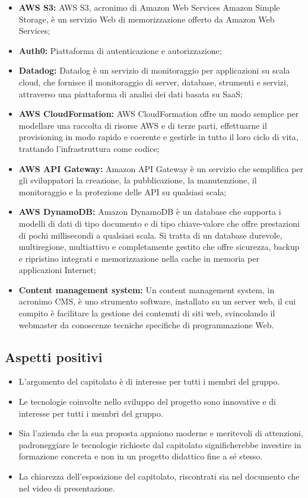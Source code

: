 \begin{itemize}
    \item \textbf{AWS S3:} AWS S3, acronimo di Amazon Web Services Amazon Simple Storage, è un servizio Web di memorizzazione offerto da Amazon Web Services;
    \item \textbf{Auth0:} Piattaforma di autenticazione e autorizzazione;
    \item \textbf{Datadog:} Datadog è un servizio di monitoraggio per applicazioni su scala cloud, che fornisce il monitoraggio di server, database, strumenti e servizi, attraverso una piattaforma di analisi dei dati basata su SaaS;
    \item \textbf{AWS CloudFormation:} AWS CloudFormation offre un modo semplice per modellare una raccolta di risorse AWS e di terze parti, effettuarne il provisioning in modo rapido e coerente e gestirle in tutto il loro ciclo di vita, trattando l'infrastruttura come codice;
    \item \textbf{AWS API Gateway:} Amazon API Gateway è un servizio che semplifica per gli sviluppatori la creazione, la pubblicazione, la manutenzione, il monitoraggio e la protezione delle API su qualsiasi scala;
    \item \textbf{AWS DynamoDB:} Amazon DynamoDB è un database che supporta i modelli di dati di tipo documento e di tipo chiave-valore che offre prestazioni di pochi millisecondi a qualsiasi scala. Si tratta di un database durevole, multiregione, multiattivo e completamente gestito che offre sicurezza, backup e ripristino integrati e memorizzazione nella cache in memoria per applicazioni Internet;
    \item \textbf{Content management system:} Un content management system, in acronimo CMS, è uno strumento software, installato su un server web, il cui compito è facilitare la gestione dei contenuti di siti web, svincolando il webmaster da conoscenze tecniche specifiche di programmazione Web.
\end{itemize}
\subsection{Aspetti positivi}
\begin{itemize}
    \item L’argomento del capitolato è di interesse per tutti i membri del gruppo.
    \item Le tecnologie coinvolte nello sviluppo del progetto sono innovative e di interesse per tutti i membri del gruppo.
    \item Sia l’azienda che la sua proposta appaiono moderne e meritevoli di attenzioni, padroneggiare le tecnologie richieste dal capitolato significherebbe investire in formazione concreta e non in un progetto didattico fine a sé stesso.
    \item La chiarezza dell’esposizione del capitolato, riscontrati sia nel documento che nel video di presentazione.
\end{itemize}
